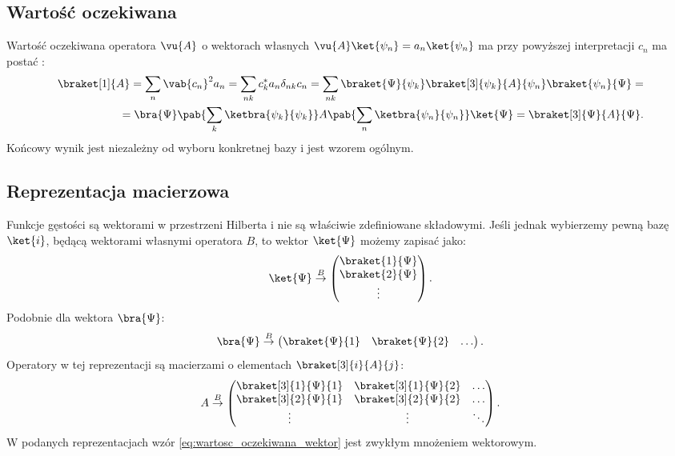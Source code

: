 \subsection{Wartość oczekiwana}
Wartość oczekiwana operatora \(\vu{A}\) o wektorach własnych \(\vu{A}\ket{\psi_{n}} = a_{n}\ket{\psi_{n}}\) ma przy powyższej interpretacji \(c_{n}\) ma postać \cite{townsend_a_modern_approach_to_quantum_mechanics}:
\begin{equation}\label{eq:wartosc_oczekiwana_wektor}
\begin{split}
	\braket[1]{A} = \sum_{n} \vab{c_{n}}^{2} a_{n} = \sum_{nk} c_{k}^{*} a_{n} \delta_{nk} c_{n} = \sum_{nk} \braket{\Psi}{\psi_{k}} \braket[3]{\psi_{k}}{A}{\psi_{n}} \braket{\psi_{n}}{\Psi} = \\ = \bra{\Psi}\pab{\sum_{k}\ketbra{\psi_{k}}{\psi_{k}}} A \pab{\sum_{n}\ketbra{\psi_{n}}{\psi_{n}}} \ket{\Psi} = \braket[3]{\Psi}{A}{\Psi}.
\end{split}
\end{equation}
Końcowy wynik jest niezależny od wyboru konkretnej bazy i jest wzorem ogólnym. 

\subsection{Reprezentacja macierzowa}
Funkcje gęstości są wektorami w przestrzeni Hilberta i nie są właściwie zdefiniowane składowymi. Jeśli jednak wybierzemy pewną bazę \(\ket{i}\), będącą wektorami własnymi operatora \(B\), to wektor \(\ket{\Psi}\) możemy zapisać jako:
\begin{equation*}
	\ket{\Psi} \overset{B}{\rightarrow} 
	\begin{pmatrix}
		\braket{1}{\Psi} \\
		\braket{2}{\Psi} \\
		\vdots
	\end{pmatrix}.
\end{equation*}
Podobnie dla wektora \(\bra{\Psi}\):
\begin{equation*}
	\bra{\Psi} \overset{B}{\rightarrow} 
	\begin{pmatrix}
		\braket{\Psi}{1} &
		\braket{\Psi}{2} &
		\ldots
	\end{pmatrix}.
\end{equation*}
Operatory w tej reprezentacji są macierzami o elementach \(\braket[3]{i}{A}{j}\):
\begin{equation*}
	A \overset{B}{\rightarrow} 
	\begin{pmatrix}
		\braket[3]{1}{\Psi}{1} & \braket[3]{1}{\Psi}{2} & \ldots \\
		\braket[3]{2}{\Psi}{1} & \braket[3]{2}{\Psi}{2} & \ldots \\
		\vdots & \vdots & \ddots \\
	\end{pmatrix}.
\end{equation*}
W podanych reprezentacjach wzór \eqref{eq:wartosc_oczekiwana_wektor} jest zwykłym mnożeniem wektorowym. 

